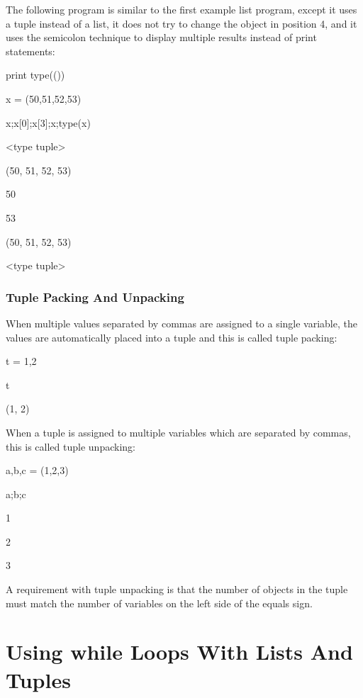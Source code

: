 \documentclass[12pt,twoside]{book}
\begin{document}
The following program is similar to the first example list program, except it uses a tuple instead of a list, it does not try to change the object in position 4, and it uses the semicolon technique to display multiple results instead of print statements: 

\bigskip

print type(())

x = (50,51,52,53)

x;x[0];x[3];x;type(x)

{\textbar}

{\textless}type {\textquotesingle}tuple{\textquotesingle}{\textgreater}

(50, 51, 52, 53)

50

53

(50, 51, 52, 53)

{\textless}type {\textquotesingle}tuple{\textquotesingle}{\textgreater}


\bigskip

\subsubsection[Tuple Packing And Unpacking]{Tuple Packing And Unpacking}

When multiple values separated by commas are assigned to a single variable, the values are automatically placed into a tuple and this is called tuple packing: 

\bigskip

t = 1,2

t

{\textbar}

(1, 2)

When a tuple is assigned to multiple variables which are separated by commas, this is called tuple unpacking: 

\bigskip

a,b,c = (1,2,3)

a;b;c

{\textbar}

1

2

3

A requirement with tuple unpacking is that the number of objects in the tuple must match the number of variables on the left side of the equals sign.

\section[Using while Loops With Lists And Tuples]{Using while Loops With Lists And Tuples}
\end{document}
